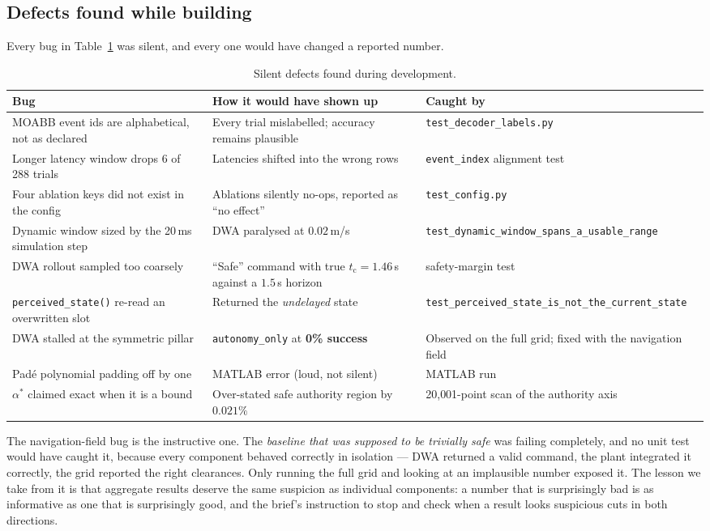 \documentclass[11pt,a4paper]{article}
\newcommand{\vauto}{\texttt{autonomy\_only}}
\newcommand{\astar}{\alpha^{*}}
\newcommand{\ttc}{t_{\mathrm{c}}}
\theoremstyle{plain}
\theoremstyle{definition}
\begin{document}
\subsection{Defects found while building}

Every bug in Table~\ref{tab:bugs} was silent, and every one would have
changed a reported number.

\begin{table}[htbp]
\centering
\small
\begin{tabular}{@{}p{4.6cm}p{5.2cm}p{4.4cm}@{}}
\toprule
Bug & How it would have shown up & Caught by \\
\midrule
MOABB event ids are alphabetical, not as declared
 & Every trial mislabelled; accuracy remains plausible
 & \texttt{test\_decoder\_labels.py} \\
Longer latency window drops 6 of 288 trials
 & Latencies shifted into the wrong rows
 & \texttt{event\_index} alignment test \\
Four ablation keys did not exist in the config
 & Ablations silently no-ops, reported as ``no effect''
 & \texttt{test\_config.py} \\
Dynamic window sized by the 20\,ms simulation step
 & DWA paralysed at $0.02$\,m/s
 & \texttt{test\_dynamic\_window\_}\allowbreak\texttt{spans\_a\_usable\_range} \\
DWA rollout sampled too coarsely
 & ``Safe'' command with true $\ttc = 1.46$\,s against a $1.5$\,s horizon
 & safety-margin test \\
\texttt{perceived\_state()} re-read an overwritten slot
 & Returned the \emph{undelayed} state
 & \texttt{test\_perceived\_state\_}\allowbreak\texttt{is\_not\_the\_}\allowbreak\texttt{current\_state} \\
DWA stalled at the symmetric pillar
 & \vauto{} at \textbf{0\% success}
 & Observed on the full grid; fixed with the navigation field \\
Pad\'e polynomial padding off by one
 & MATLAB error (loud, not silent)
 & MATLAB run \\
$\astar$ claimed exact when it is a bound
 & Over-stated safe authority region by $0.021\%$
 & 20{,}001-point scan of the authority axis \\
\bottomrule
\end{tabular}
\caption{Silent defects found during development.}
\label{tab:bugs}
\end{table}

The navigation-field bug is the instructive one. The \emph{baseline that
was supposed to be trivially safe} was failing completely, and no unit
test would have caught it, because every component behaved correctly in
isolation --- DWA returned a valid command, the plant integrated it
correctly, the grid reported the right clearances. Only running the full
grid and looking at an implausible number exposed it. The lesson we take
from it is that aggregate results deserve the same suspicion as
individual components: a number that is surprisingly bad is as
informative as one that is surprisingly good, and the brief's instruction
to stop and check when a result looks suspicious cuts in both
directions.
\end{document}
